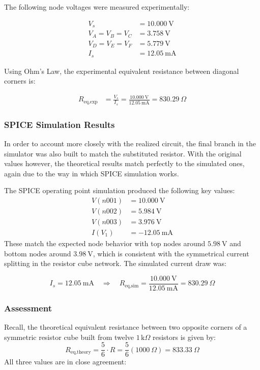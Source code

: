 \documentclass[12pt]{article}
\begin{document}
The following node voltages were measured experimentally:

\begin{align*}
	V_s             & = 10.000\ \text{V} \\
	V_A = V_B = V_C & = 3.758\ \text{V}  \\
	V_D = V_E = V_F & = 5.779\ \text{V}  \\
	I_s             & = 12.05\ \text{mA}
\end{align*}

Using Ohm’s Law, the experimental equivalent resistance between diagonal corners is:

\begin{align*}
	R_{\text{eq,exp}} & = \frac{V_s}{I_s} = \frac{10.000\ \text{V}}{12.05\ \text{mA}} = 830.29\ \Omega
\end{align*}

\subsubsection{SPICE Simulation Results}
In order to account more closely with the realized circuit, the final branch in
the simulator was also built to match the substituted resistor. With the
original values however, the theoretical results match perfectly to the
simulated ones, again due to the way in which SPICE simulation works.

The SPICE operating point simulation produced the following key values:
\begin{align*}
	V(n001) & = 10.000\ \text{V}  \\
	V(n002) & = 5.984\ \text{V}   \\
	V(n003) & = 3.976\ \text{V}   \\
	I(V_1)  & = -12.05\ \text{mA}
\end{align*}
These match the expected node behavior with top nodes around $5.98\ \text{V}$ and bottom nodes around $3.98\ \text{V}$, which is consistent with the symmetrical current splitting in the resistor cube network. The simulated current draw was:

\[
	I_s = 12.05\ \text{mA} \quad \Rightarrow \quad R_{\text{eq,sim}} = \frac{10.000\ \text{V}}{12.05\ \text{mA}} = 830.29\ \Omega
\]

\subsubsection{Assessment}
Recall, the theoretical equivalent resistance between two opposite corners of a symmetric resistor cube built from twelve $1\,\text{k}\Omega$ resistors is given by:
\[
	R_{\text{eq,theory}} = \frac{5}{6} \cdot R = \frac{5}{6}(1000\ \Omega) = 833.33\ \Omega
\]
All three values are in close agreement:
\end{document}
